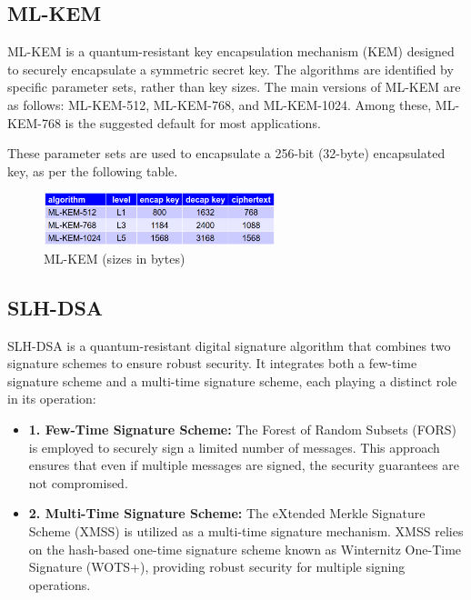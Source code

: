 \subsection{ML-KEM}
ML-KEM is a quantum-resistant key encapsulation mechanism (KEM)
designed to securely encapsulate a symmetric secret key. The
algorithms are identified by specific parameter sets, rather than key
sizes. The main versions of ML-KEM are as follows: 
ML-KEM-512, ML-KEM-768, and ML-KEM-1024. Among these, ML-KEM-768 is
the suggested default for most applications. 

These parameter sets are used to encapsulate a 256-bit (32-byte)
encapsulated key, as per the following table. 

\begin{figure}[H]
  \centering
  \includegraphics[width=0.6\textwidth]{img/mlkem.png}
  \caption{ML-KEM (sizes in bytes)}
\end{figure}

\subsection{SLH-DSA}

SLH-DSA is a quantum-resistant digital signature algorithm that
combines two signature schemes to ensure robust security. It
integrates both a few-time signature scheme and a multi-time signature
scheme, each playing a distinct role in its operation: 

\begin{itemize}
  \item \textbf{1. Few-Time Signature Scheme:}  The Forest of Random
    Subsets (FORS) is employed to securely sign a limited number of
    messages. This approach ensures that even if multiple messages are
    signed, the security guarantees are not compromised.

  \item \textbf{2. Multi-Time Signature Scheme:}  The eXtended Merkle
    Signature Scheme (XMSS) is utilized as a multi-time signature
    mechanism. XMSS relies on the hash-based one-time signature scheme
    known as Winternitz One-Time Signature (WOTS+), providing robust
    security for multiple signing operations. 
\end{itemize}

